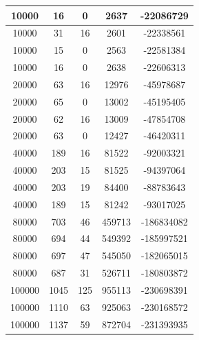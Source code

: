 \documentclass[a4paper]{article}
\begin{document}
\begin{table}[H]
\begin{minipage}[t]{10cm}
\begin{tabular}{|c|c|c|c|c|}
      10000         & 16            & 0                   & 2637             & -22086729    \\ \hline
      10000         & 31            & 16                  & 2601             & -22338561    \\ \hline
      10000         & 15            & 0                   & 2563             & -22581384    \\ \hline
      10000         & 16            & 0                   & 2638             & -22606313    \\ \hline
      20000         & 63            & 16                  & 12976            & -45978687    \\ \hline
      20000         & 65            & 0                   & 13002            & -45195405    \\ \hline
      20000         & 62            & 16                  & 13009            & -47854708    \\ \hline
      20000         & 63            & 0                   & 12427            & -46420311    \\ \hline
      40000         & 189           & 16                  & 81522            & -92003321    \\ \hline
      40000         & 203           & 15                  & 81525            & -94397064    \\ \hline
      40000         & 203           & 19                  & 84400            & -88783643    \\ \hline
      40000         & 189           & 15                  & 81242            & -93017025    \\ \hline
      80000         & 703           & 46                  & 459713           & -186834082   \\ \hline
      80000         & 694           & 44                  & 549392           & -185997521   \\ \hline
      80000         & 697           & 47                  & 545050           & -182065015   \\ \hline
      80000         & 687           & 31                  & 526711           & -180803872   \\ \hline
      100000        & 1045          & 125                 & 955113           & -230698391   \\ \hline
      100000        & 1110          & 63                  & 925063           & -230168572   \\ \hline
      100000        & 1137          & 59                  & 872704           & -231393935   \\ \hline

\end{tabular}
\end{minipage}
\end{table}
\end{document}
